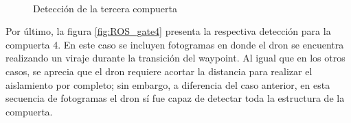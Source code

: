 \begin{figure}[ht]
    \centering
     \hspace{0.2 pt}
     \hspace{0.2 pt}
     \hspace{0.2 pt}
     \\
     \hspace{0.2 pt}
     \hspace{0.2 pt}
     \hspace{0.2 pt}
    
    \caption{Detección de la tercera compuerta}
    \label{fig:ROS_gate3}
\end{figure}

Por último, la figura \ref{fig:ROS_gate4} presenta la respectiva detección para la compuerta 4. En este caso se incluyen fotogramas en donde el dron se encuentra realizando un viraje durante la transición del waypoint. Al igual que en los otros casos, se aprecia que el dron requiere acortar la distancia para realizar el aislamiento por completo; sin embargo, a diferencia del caso anterior, en esta secuencia de fotogramas el dron sí fue capaz de detectar toda la estructura de la compuerta.

